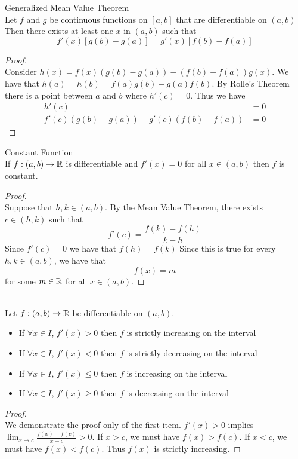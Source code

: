 \documentclass[a4paper]{article}
\begin{document}
\begin{thm}{Generalized Mean Value Theorem}{}\\ Let $f$ and $g$ be continuous functions on $[a,b]$ that are differentiable on $(a,b)$ Then there exists at least one $x$ in $(a,b)$ such that $$f'(x)[g(b)-g(a)]=g'(x)[f(b)-f(a)]$$
\begin{proof}\\ Consider $h(x)=f(x)(g(b)-g(a))-(f(b)-f(a))g(x)$. We have that $h(a)=h(b)=f(a)g(b)-g(a)f(b)$. By Rolle's Theorem there is a point between $a$ and $b$ where $h'(c)=0$. Thus we have 
\begin{align*}
h'(c)&=0\\
f'(c)(g(b)-g(a))-g'(c)(f(b)-f(a))&=0
\end{align*}
\end{proof}
\end{thm}


\begin{thm}{Constant Function}{}\\ If $f:(a,b)\to\mathbb{R}$ is differentiable and $f'(x)=0$ for all $x\in(a,b)$ then $f$ is constant. 
\begin{proof}\\ Suppose that $h,k\in(a,b)$. By the Mean Value Theorem, there exists $c\in(h,k)$ such that $$f'(c)=\frac{f(k)-f(h)}{k-h}$$ Since $f'(c)=0$ we have that $f(h)=f(k)$ Since this is true for every $h,k\in(a,b)$, we have that $$f(x)=m$$ for some $m\in\mathbb{R}$ for all $x\in(a,b)$. 
\end{proof}
\end{thm}


\begin{thm}{}{}\\ Let $f:(a,b)\to\mathbb{R}$ be differentiable on $(a,b)$. 
\begin{itemize}
\item If $\forall x\in I$, $f'(x)>0$ then $f$ is strictly increasing on the interval
\item If $\forall x\in I$, $f'(x)<0$ then $f$ is strictly decreasing on the interval
\item If $\forall x\in I$, $f'(x)\leq 0$ then $f$ is increasing on the interval
\item If $\forall x\in I$, $f'(x)\geq 0$ then $f$ is decreasing on the interval
\end{itemize}
\begin{proof}\\ We demonstrate the proof only of the first item. $f'(x)>0$ implies $\lim_{x\to c}\frac{f(x)-f(c)}{x-c}>0$. If $x>c$, we must have $f(x)>f(c)$. If $x<c$, we must have $f(x)<f(c)$. Thus $f(x)$ is strictly increasing. 
\end{proof}
\end{thm}
\end{document}
